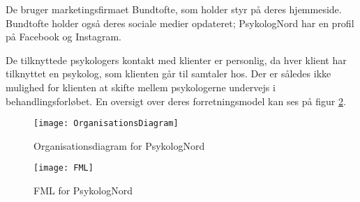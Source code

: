 De bruger marketingsfirmaet Bundtofte, som holder styr på deres hjemmeside. Bundtofte holder også deres sociale medier opdateret; PsykologNord har en profil på Facebook og Instagram.

De tilknyttede psykologers kontakt med klienter er personlig, da hver klient har tilknyttet en psykolog, som klienten går til samtaler hos.
Der er således ikke mulighed for klienten at skifte mellem psykologerne undervejs i behandlingsforløbet.
En oversigt over deres forretningsmodel kan ses på figur \ref{forretning:fml}.

\begin{figure}[h]
    \caption{Organisationsdiagram for PsykologNord}
    \centering
        \texttt{[image: OrganisationsDiagram]}
    \label{forretning:organisationsdiagram}
\end{figure}

\begin{figure}[ht]
    \caption{FML for PsykologNord}
    \centering
        \texttt{[image: FML]}
    \label{forretning:fml}
\end{figure}

